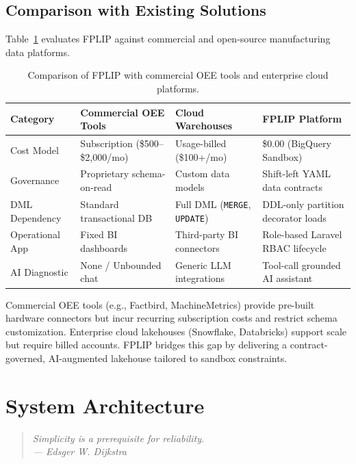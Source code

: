 \documentclass[12pt, a4paper]{report}
\newcommand{\epigraph}[2]{%
  \begin{quote}
    \raggedleft \small \itshape \color{primary!80!black} #1 \\
    \vspace{0.1cm}
    \normalfont \color{darkgray} #2
  \end{quote}
  \vspace{0.4cm}
}
\begin{document}
\section{Comparison with Existing Solutions}
Table~\ref{tab:existing-solutions} evaluates FPLIP against commercial and open-source manufacturing data platforms.

\begin{table}[h]
\centering
\begin{tabularx}{\textwidth}{p{2.8cm} p{3.2cm} p{3.2cm} X}
\toprule
\textbf{\color{primary}Category} & \textbf{\color{primary}Commercial OEE Tools} & \textbf{\color{primary}Cloud Warehouses} & \textbf{\color{primary}FPLIP Platform} \\
\midrule
Cost Model & Subscription (\$500--\$2,000/mo) & Usage-billed (\$100+/mo) & \$0.00 (BigQuery Sandbox) \\
Governance & Proprietary schema-on-read & Custom data models & Shift-left YAML data contracts \\
DML Dependency & Standard transactional DB & Full DML (\texttt{MERGE}, \texttt{UPDATE}) & DDL-only partition decorator loads \\
Operational App & Fixed BI dashboards & Third-party BI connectors & Role-based Laravel RBAC lifecycle \\
AI Diagnostic & None / Unbounded chat & Generic LLM integrations & Tool-call grounded AI assistant \\
\bottomrule
\end{tabularx}
\caption{Comparison of FPLIP with commercial OEE tools and enterprise cloud platforms.}
\label{tab:existing-solutions}
\end{table}

Commercial OEE tools (e.g., Factbird, MachineMetrics) provide pre-built hardware connectors but incur recurring subscription costs and restrict schema customization. Enterprise cloud lakehouses (Snowflake, Databricks) support scale but require billed accounts. FPLIP bridges this gap by delivering a contract-governed, AI-augmented lakehouse tailored to sandbox constraints.

\chapter{System Architecture}
\label{chap:architecture}

\epigraph{Simplicity is a prerequisite for reliability.}{--- Edsger W. Dijkstra}
\end{document}
